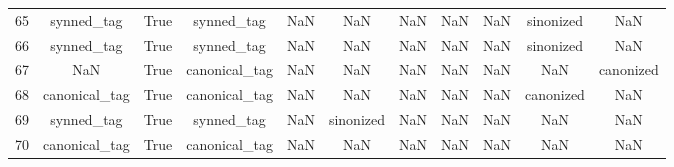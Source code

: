 \begin{table}[h!]
{\begin{tabular}{|c|c|c|c|c|c|c|c|c|c|c|}
         65 &                synned\_tag &                              True &                   synned\_tag &                                  NaN &                                  NaN &                                  NaN &                                  NaN &                                  NaN &                            sinonized &                                                NaN \\
         66 &                synned\_tag &                              True &                   synned\_tag &                                  NaN &                                  NaN &                                  NaN &                                  NaN &                                  NaN &                            sinonized &                                                NaN \\
         67 &                       NaN &                              True &                canonical\_tag &                                  NaN &                                  NaN &                                  NaN &                                  NaN &                                  NaN &                                  NaN &                                          canonized \\
         68 &             canonical\_tag &                              True &                canonical\_tag &                                  NaN &                                  NaN &                                  NaN &                                  NaN &                                  NaN &                            canonized &                                                NaN \\
         69 &                synned\_tag &                              True &                   synned\_tag &                                  NaN &                            sinonized &                                  NaN &                                  NaN &                                  NaN &                                  NaN &                                                NaN \\
         70 &             canonical\_tag &                              True &                canonical\_tag &                                  NaN &                                  NaN &                                  NaN &                                  NaN &                                  NaN &                                  NaN &                                                NaN \\

\end{tabular}}
\end{table}
